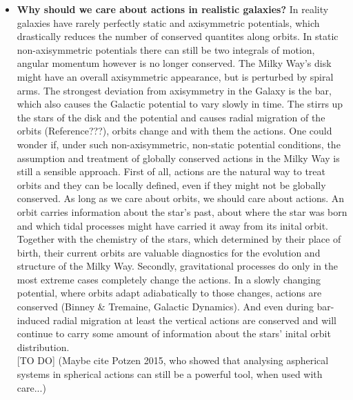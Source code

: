 \begin{itemize}
\item \textbf{Why should we care about actions in realistic galaxies?} In reality galaxies have rarely perfectly static and axisymmetric potentials, which drastically reduces the number of conserved quantites along orbits. In static non-axisymmetric  potentials there can still be two integrals of motion, angular momentum however is no longer conserved. The Milky Way's disk might have an overall axisymmetric appearance, but is perturbed by spiral arms. The strongest deviation from axisymmetry in the Galaxy is the bar, which also causes the Galactic potential to vary slowly in time. The stirrs up the stars of the disk and the potential and causes radial migration of the orbits (Reference???), orbits change and with them the actions. One could wonder if, under such non-axisymmetric, non-static potential conditions, the assumption and treatment of globally conserved actions in the Milky Way is still a sensible approach. First of all, actions are the natural way to treat orbits and they can be locally defined, even if they might not be globally conserved. As long as we care about orbits, we should care about actions. An orbit carries information about the star's past, about where the star was born and which tidal processes might have carried it away from its inital orbit. Together with the chemistry of the stars, which determined by their place of birth, their current orbits are valuable diagnostics for the evolution and structure of the Milky Way. Secondly, gravitational processes do only in the most extreme cases completely change the actions. In a slowly changing potential, where orbits adapt adiabatically to those changes, actions are conserved (Binney \& Tremaine, Galactic Dynamics). And even during bar-induced radial migration at least the vertical actions are conserved and will continue to carry some amount of information about the stars' inital orbit distribution.\\

[TO DO] (Maybe cite Potzen 2015, who showed that analysing aspherical systems in spherical actions can still be a powerful tool, when used with care...)


\end{itemize}
